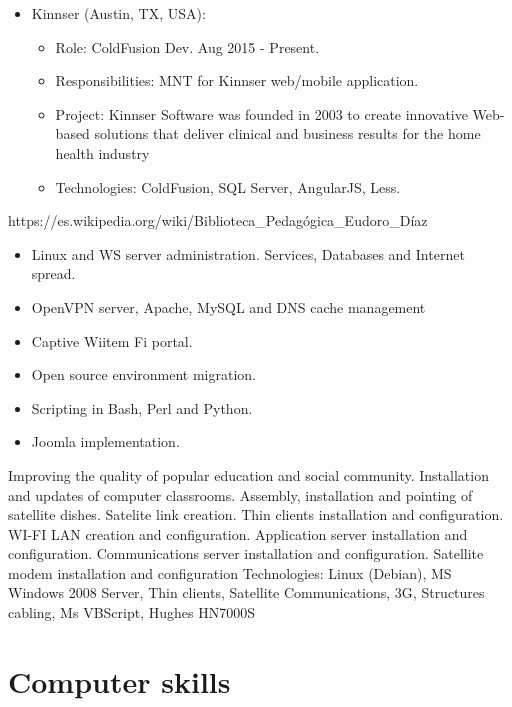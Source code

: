 \documentclass[11pt,a4paper,sans]{moderncv}        %
\begin{document}
{\begin{itemize}
\begin{itemize}
        \end{itemize}
      \item Kinnser (Austin, TX, USA):
       \begin{itemize}
          \item Role: ColdFusion Dev. Aug 2015 - Present.
          \item Responsibilities: MNT for Kinnser web/mobile application.
          \item Project: Kinnser Software was founded in 2003 to create innovative Web-based solutions that deliver clinical and business results for the home health industry
          \item Technologies: ColdFusion, SQL Server, AngularJS, Less.
        \end{itemize}
    \end{itemize}
  }
  {
    https://es.wikipedia.org/wiki/Biblioteca\_Pedagógica\_Eudoro\_Díaz\\
    \begin{itemize}
      \item Linux and WS server administration. Services, Databases and Internet spread.
      \item OpenVPN server, Apache, MySQL and DNS cache management
      \item Captive Wiitem Fi portal.
      \item Open source environment migration.
      \item Scripting in Bash, Perl and Python.
      \item Joomla implementation.
    \end{itemize}
  }
  {
    Improving the quality of popular education and social community. Installation and updates of computer classrooms. Assembly, installation and pointing of satellite dishes. Satelite link creation. Thin clients installation and configuration. WI-FI LAN creation and configuration. Application server installation and configuration. Communications server installation and configuration. Satellite modem installation and configuration Technologies: Linux (Debian), MS Windows 2008 Server, Thin clients, Satellite Communications, 3G, Structures cabling, Ms VBScript, Hughes HN7000S
  }

\section{Computer skills}
\end{document}
